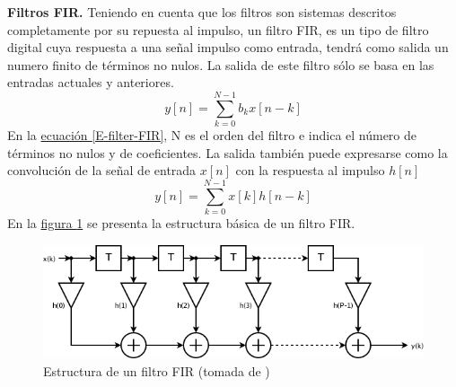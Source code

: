 \documentclass[11pt,lettersize]{article} %
\newcommand{\figura}[1]{\hyperref[{#1}]{figura \ref*{#1}}}
\newcommand{\ecuacion}[1]{\hyperref[{#1}]{ecuación \ref*{#1}}}
\begin{document}
\textbf{Filtros FIR.}
Teniendo en cuenta que los filtros son sistemas descritos completamente por su repuesta al impulso, un filtro FIR, es un tipo de filtro digital cuya respuesta a una señal impulso como entrada, tendrá como salida un numero finito de términos no nulos. La salida de este filtro sólo se basa en las entradas actuales y anteriores.
\begin{equation}
	y[n] = \sum_{k=0}^{N-1} b_{k} x[n-k]
	\label{E-filter-FIR}
\end{equation}
En la \ecuacion{E-filter-FIR}, N es el orden del filtro e indica el número de términos no nulos y de coeficientes. La salida también puede expresarse como la convolución de la señal de entrada $x[n]$
con la respuesta al impulso $h[n]$
\begin{equation}
	y[n] = \sum_{k=0}^{N-1} x[k] h[n-k]
\end{equation}
En la \figura{F-FIR} se presenta la estructura básica de un filtro FIR.
\begin{figure}[h!]
	\centering
	\includegraphics[width=1\textwidth]{images/FIR.png}
	\caption[Estructura de un filtro FIR]{Estructura de un filtro FIR (tomada de \cite{WikiFIR})}
	\label{F-FIR}
\end{figure}
\end{document}
